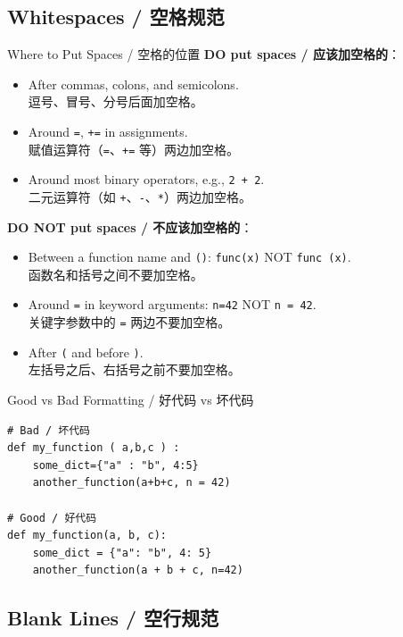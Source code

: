\documentclass[11pt,a4paper]{report}
\let\oldtexttt\texttt
\renewcommand{\texttt}[1]{\textcolor{mainblue}{\oldtexttt{#1}}}
\begin{document}
\subsection{Whitespaces / 空格规范}

\begin{concept}{Where to Put Spaces / 空格的位置}
    \textbf{DO put spaces / 应该加空格的}：
    \begin{itemize}
        \item After commas, colons, and semicolons. \\
        逗号、冒号、分号后面加空格。
        \item Around \texttt{=}, \texttt{+=} in assignments. \\
        赋值运算符（\texttt{=}、\texttt{+=} 等）两边加空格。
        \item Around most binary operators, e.g., \texttt{2 + 2}. \\
        二元运算符（如 \texttt{+}、\texttt{-}、\texttt{*}）两边加空格。
    \end{itemize}

    \textbf{DO NOT put spaces / 不应该加空格的}：
    \begin{itemize}
        \item Between a function name and \texttt{()}: \texttt{func(x)} NOT \texttt{func (x)}. \\
        函数名和括号之间不要加空格。
        \item Around \texttt{=} in keyword arguments: \texttt{n=42} NOT \texttt{n = 42}. \\
        关键字参数中的 \texttt{=} 两边不要加空格。
        \item After \texttt{(} and before \texttt{)}. \\
        左括号之后、右括号之前不要加空格。
    \end{itemize}
\end{concept}

\begin{examplebox}{Good vs Bad Formatting / 好代码 vs 坏代码}
\begin{lstlisting}
# Bad / 坏代码
def my_function ( a,b,c ) :
    some_dict={"a" : "b", 4:5}
    another_function(a+b+c, n = 42)

# Good / 好代码
def my_function(a, b, c):
    some_dict = {"a": "b", 4: 5}
    another_function(a + b + c, n=42)
\end{lstlisting}
\end{examplebox}

\subsection{Blank Lines / 空行规范}
\end{document}
